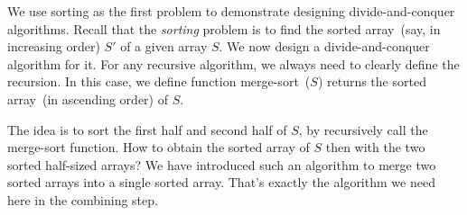 We use sorting as the first problem
to demonstrate designing divide-and-conquer algorithms.
Recall that the \emph{sorting} problem is to find the sorted array~(say, in increasing order) $S'$ of a given array $S$.  
We now design a divide-and-conquer algorithm for it. For any recursive algorithm, we always need to
clearly define the recursion. In this case, we define function merge-sort~($S$) returns the
sorted array~(in ascending order) of $S$.

The idea is to sort the first half and second half of $S$, by recursively call the merge-sort function.
How to obtain the sorted array of $S$ then with the two sorted half-sized arrays?
We have introduced such an algorithm to merge two sorted arrays into a single sorted array.
That's exactly the algorithm we need here in the combining step.

\begin{minipage}{0.8\textwidth}
	\xxx
	\xxx
	\xxx
	\xxx
	\xxx
	\xxx
\end{minipage}

